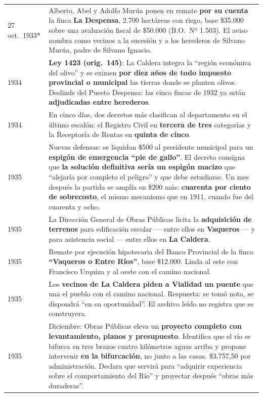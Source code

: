 \begin{longtable}{@{}p{2.7cm}p{10.3cm}@{}}
27 oct.\ 1933* & Alberto, Abel y Adolfo Murúa ponen en remate \textbf{por su cuenta} la finca \textbf{La Despensa}, 2.700 hectáreas con riego, base \$35.000 sobre una avaluación fiscal de \$50.000 (B.O.\ Nº 1.503). El aviso nombra como vecinos a la sucesión y a los herederos de Silvano Murúa, padre de Silvano Ignacio. \\
1934 & \textbf{Ley 1423 (orig.\ 145)}: La Caldera integra la ``región económica del olivo'' y se eximen \textbf{por diez años de todo impuesto provincial o municipal} las tierras donde se planten olivos. Deslinde del Puesto Despensa: las cinco fincas de 1932 ya están \textbf{adjudicadas entre herederos}. \\
1934 & En cinco días, dos decretos más clasifican al departamento en el último escalón: el Registro Civil en \textbf{tercera de tres} categorías y la Receptoría de Rentas en \textbf{quinta de cinco}. \\
1935 & Nuevas defensas: se liquidan \$500 al presidente municipal para un \textbf{espigón de emergencia ``pie de gallo''}. El decreto consigna que \textbf{la solución definitiva sería un espigón macizo} que ``alejaría por completo el peligro'' y que debe estudiarse. Un mes después la partida se amplía en \$200 más: \textbf{cuarenta por ciento de sobrecosto}, el mismo mecanismo que en 1911, cuando fue del cuarenta y ocho. \\
1935 & La Dirección General de Obras Públicas licita la \textbf{adquisición de terrenos} para edificación escolar --- entre ellos en \textbf{Vaqueros} --- y para asistencia social --- entre ellos en \textbf{La Caldera}. \\
1935 & Remate por ejecución hipotecaria del Banco Provincial de la finca \textbf{``Vaqueros o Entre Ríos''}, base \$12.000. Linda al este con Francisco Urquiza\index{Urquiza, Francisco S.} y al oeste con el camino nacional. \\
1935 & Los \textbf{vecinos de La Caldera piden a Vialidad un puente} que una el pueblo con el camino nacional. Respuesta: se tomó nota, se dispondrá ``en su oportunidad''. El archivo leído no registra que se construyera. \\
1935 & Diciembre: Obras Públicas eleva un \textbf{proyecto completo con levantamiento, planos y presupuesto}. Identifica que el río se bifurca en tres brazos cuatro kilómetros aguas arriba y propone intervenir \textbf{en la bifurcación}, no junto a las casas. \$3.757,50 por administración. Declara que servirá para ``adquirir experiencia sobre el comportamiento del Río'' y proyectar después ``obras más duraderas''. \\

\end{longtable}
